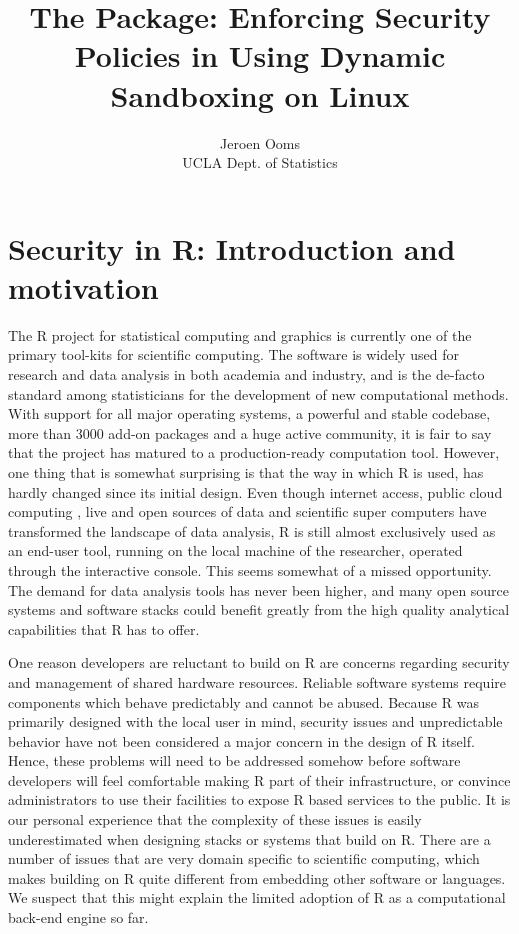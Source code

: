 \documentclass[article]{jss}
\author{Jeroen Ooms\\UCLA Dept. of Statistics 
}
\title{The \RAppArmor Package: Enforcing Security Policies in \R Using Dynamic
Sandboxing on Linux}
\newcommand{\R}{\textsf{R}\xspace}
\begin{document}
\section[Security in R: Introduction and motivation]{Security in \R:
Introduction and motivation}

The \R project for statistical computing and graphics
\citep{R-project} is currently one of the primary tool-kits for scientific
computing. The software is widely used for research and data analysis in both
academia and industry, and is the de-facto standard among statisticians for the
development of new computational methods. With support for all major
operating systems, a powerful and stable codebase, more than 3000 add-on
packages and a huge active community, it is fair to say that the project has
matured to a production-ready computation tool. However, one thing that is
somewhat surprising is that the way in which \R is used, has hardly
changed since its initial design. Even though internet access, public
cloud computing \citep{armbrust2010view}, live and open sources of data and
scientific super computers have transformed the landscape of data analysis, \R
is still almost exclusively used as an end-user tool, running on the local
machine of the researcher, operated through the interactive console. This seems
somewhat of a missed opportunity. The demand for data analysis tools has never
been higher, and many open source systems and software stacks could benefit
greatly from the high quality analytical capabilities that \R has to
offer.

One reason developers are reluctant to build on \R are concerns regarding
security and management of shared hardware resources. Reliable software systems
require components which behave predictably and cannot be abused. Because
\R was primarily designed with the local user in mind, security issues and
unpredictable behavior have not been considered a major concern in the design
of \R itself. Hence, these problems will need to be addressed somehow before
software developers will feel comfortable making \R part of their
infrastructure, or convince administrators to use their facilities to expose \R
based services to the public. It is our personal experience that the complexity of these issues is easily
underestimated when designing stacks or systems that build on \R.
There are a number of issues that are very domain specific to scientific
computing, which makes building on \R quite different from embedding
other software or languages. We suspect that this might explain the limited
adoption of \R as a computational back-end engine so far.
\end{document}
